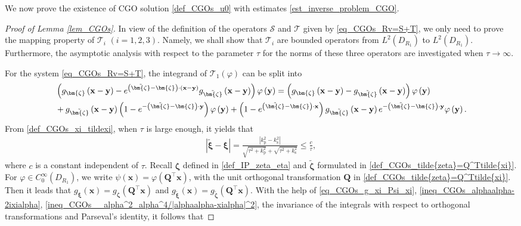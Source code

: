 \documentclass[11pt,reqno,oneside]{amsart}
\theoremstyle{definition}
\theoremstyle{remark}
\numberwithin{equation}{section}
\numberwithin{equation}{section}
\theoremstyle{remark}
\begin{document}
We now prove the existence of CGO solution \eqref{def_CGOs_u0} with estimates \eqref{est_inverse_problem_CGO}.


\begin{proof}[Proof of Lemma \ref{lem_CGOs}]

In view of the definition of the operators $\mathcal S$ and $\mathcal T$ given by \eqref{eq_CGOs_Rv=S+T}, we only need to prove the mapping property of $\mathcal T_i$ $(i=1,2,3)$. Namely, we shall show that $\mathcal T_i$ are bounded operators from $L^2(D_{R_1})$ to $L^2(D_{R_1})$. Furthermore, the asymptotic analysis with respect to the parameter $\tau$ for the norms of these three operators are investigated when $\tau \rightarrow \infty$.  
	
	For the system \eqref{eq_CGOs_Rv=S+T}, the integrand of $ \mathcal{T}_1\left(\varphi\right) $ can be split into
	\begin{align} \label{eq_CGOs_split_g-eg}
		& \left(g_{\bm{\zeta}}\left(\mathbf{x} - \mathbf{y}\right) - e^{\left(\tilde{\bm{\zeta}}-\bm{\zeta}\right) \cdot \left(\mathbf{x} - \mathbf{y}\right)} g_{\tilde{\bm{\zeta}}}\left(\mathbf{x} - \mathbf{y}\right)\right) \varphi \left(\mathbf{y}\right) = \left(g_{\bm{\zeta}}\left(\mathbf{x} - \mathbf{y}\right) -  g_{\tilde{\bm{\zeta}}}\left(\mathbf{x} - \mathbf{y}\right)\right) \varphi \left(\mathbf{y}\right) \\
		& + g_{\tilde{\bm{\zeta}}}\left(\mathbf{x} - \mathbf{y}\right) \left(1 - e^{-\left(\tilde{\bm{\zeta}}-\bm{\zeta}\right) \cdot \mathbf{y}} \right) \varphi \left(\mathbf{y}\right) + \left(1 - e^{\left(\tilde{\bm{\zeta}}-\bm{\zeta}\right) \cdot \mathbf{x}} \right) g_{\tilde{\bm{\zeta}}}\left(\mathbf{x} - \mathbf{y}\right) e^{-\left(\tilde{\bm{\zeta}}-\bm{\zeta}\right) \cdot \mathbf{y}} \varphi \left(\mathbf{y}\right). \notag
	\end{align}
	From \eqref{def_CGOs_xi_tildexi}, when $ \tau $ is large enough, it yields that
	\begin{align} \label{ineq_CGOs_tildexi-xi}
		\left|\tilde{\bm{\xi}} - \bm{\xi} \right| = \frac{\left| k_{\mathrm{p}}^2 - k_{\mathrm{s}}^2 \right|}{\sqrt{\tau^2+k_{\mathrm{p}}^2} + \sqrt{\tau^2+k_{\mathrm{s}}^2}} \leqslant \frac{c}{\tau},
	\end{align}
	where $ c $ is a constant independent of $ \tau $. Recall $ \bm{\zeta} $ defined in \eqref{def_IP_zeta_eta} and $ \tilde{\bm{\zeta}} $ formulated in \eqref{def_CGOs_tilde{zeta}=Q^Ttilde{xi}}. For $ \varphi \in C^{\infty}_0 \left(D_{R_1}\right) $, we write $ \psi \left(\mathbf{x}\right) = \varphi \left(\mathbf{Q}^{\top} \mathbf{x}\right) $, with the unit orthogonal transformation $ \mathbf{Q} $ in \eqref{def_CGOs_tilde{zeta}=Q^Ttilde{xi}}. Then it leads that $ g_{\bm{\xi}}\left(\mathbf{x}\right) = g_{\bm{\zeta}}\left(\mathbf{Q}^{\top}\mathbf{x}\right) $ and $ g_{\tilde{\bm{\xi}}}\left(\mathbf{x}\right) = g_{\tilde{\bm{\zeta}}}\left(\mathbf{Q}^{\top}\mathbf{x}\right) $. With the help of \eqref{eq_CGOs_g_xi_Psi_xi}, \eqref{ineq_CGOs_alphaalpha-2ixialpha}, \eqref{ineq_CGOs__alpha^2_alpha^4/|alphaalpha-xialpha|^2}, the invariance of the integrals with respect to orthogonal transformations and Parseval's identity, it follows that

\end{proof}
\end{document}
